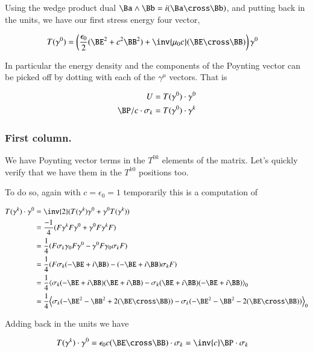 \documentclass{article}
\begin{document}
Using the wedge product dual $\Ba \wedge \Bb = i (\Ba \cross \Bb)$, and putting back in the units, we have our
first stress energy four vector, 

\begin{align}
T(\gamma^0) &= \left( \frac{\epsilon_0}{2} (\BE^2 + c^2 \BB^2) + \inv{\mu_0 c} (\BE \cross \BB) \right) \gamma^0 
\end{align}

In particular the energy density and the components of the Poynting vector can be picked off by dotting with each of the $\gamma^\mu$ vectors.  That is

\begin{align}
U                    &= T(\gamma^0) \cdot \gamma^0 \\
\BP/c \cdot \sigma_k &= T(\gamma^0) \cdot \gamma^k
\end{align}

\subsubsection{ First column. }

We have Poynting vector terms in the $T^{0k}$ elements of the matrix.  Let's quickly verify that we have them
in the $T^{k0}$ positions too.

To do so, again with $c = \epsilon_0 = 1$ temporarily this is a computation of

\begin{align*}
T(\gamma^k) \cdot \gamma^0 
&= \inv{2} (T(\gamma^k) \gamma^0 + \gamma^0 T(\gamma^k)) \\
&= \frac{-1}{4} (F \gamma^k F \gamma^0 + \gamma^0 F \gamma^k F) \\
&= \frac{1}{4} (F \sigma_k \gamma_0 F \gamma^0 - \gamma^0 F \gamma_0 \sigma_k F) \\
&= \frac{1}{4} (F \sigma_k (-\BE + i \BB) - (-\BE + i\BB) \sigma_k F) \\
&= \frac{1}{4} \gpgradezero{\sigma_k (-\BE + i \BB)(\BE + i \BB) - \sigma_k (\BE + i \BB)(-\BE + i\BB) } \\
&= \frac{1}{4} \gpgradezero{\sigma_k (-\BE^2 -\BB^2 +2 (\BE \cross \BB)) - \sigma_k (-\BE^2 -\BB^2 - 2(\BE \cross \BB)) } \\
\end{align*}

Adding back in the units we have

\begin{align}
T(\gamma^k) \cdot \gamma^0 &= \epsilon_0 c (\BE \cross \BB) \cdot \sigma_k = \inv{c}\BP \cdot \sigma_k
\end{align}
\end{document}
